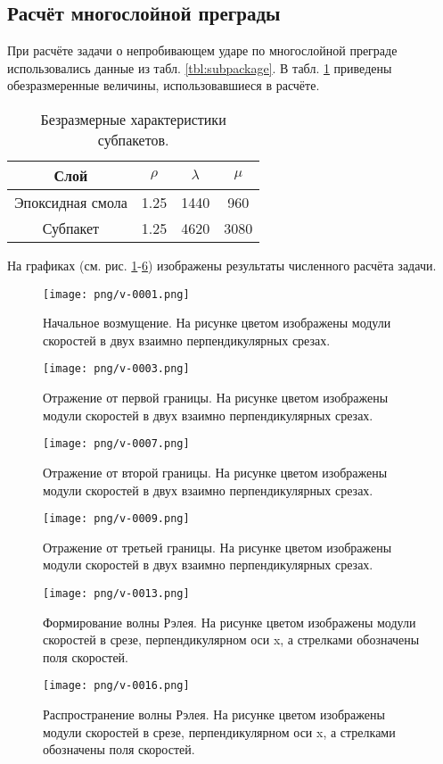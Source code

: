 \subsection{Расчёт многослойной преграды}
При расчёте задачи о непробивающем ударе по многослойной преграде использовались
данные из табл. \ref{tbl:subpackage}. В табл. \ref{tbl:subpackage_2} приведены
обезразмеренные величины, использовавшиеся в расчёте.
\begin{table}[h]
\centering
\begin{tabular}{|c|c|c|c|}
\hline
Слой & $\rho$ & $\lambda$ & $\mu$  \\
\hline
Эпоксидная смола & 1.25 & 1440 & 960 \\
Субпакет & 1.25 & 4620 & 3080 \\
\hline
\end{tabular}
\caption{Безразмерные характеристики субпакетов.}
\label{tbl:subpackage_2}
\end{table}
На графиках (см. рис. \ref{pic:multilayer_init}-\ref{pic:multilayer_Rayleigh_2})
изображены результаты численного расчёта задачи.
\begin{figure}[htp]
\centering
\texttt{[image: png/v-0001.png]}
\caption{Начальное возмущение. На рисунке цветом изображены модули скоростей в
двух взаимно перпендикулярных срезах.}
\label{pic:multilayer_init}
\end{figure}
\begin{figure}[htp]
\centering
\texttt{[image: png/v-0003.png]}
\caption{Отражение от первой границы. На рисунке цветом изображены модули скоростей в
двух взаимно перпендикулярных срезах.}
\label{pic:multilayer_b1}
\end{figure}
\begin{figure}[htp]
\centering
\texttt{[image: png/v-0007.png]}
\caption{Отражение от второй границы. На рисунке цветом изображены модули скоростей в
двух взаимно перпендикулярных срезах.}
\label{pic:multilayer_b2}
\end{figure}
\begin{figure}[htp]
\centering
\texttt{[image: png/v-0009.png]}
\caption{Отражение от третьей границы. На рисунке цветом изображены модули скоростей в
двух взаимно перпендикулярных срезах.}
\label{pic:multilayer_b3}
\end{figure}
\begin{figure}[htp]
\centering
\texttt{[image: png/v-0013.png]}
\caption{Формирование волны Рэлея. На рисунке цветом изображены модули скоростей
в срезе, перпендикулярном оси x, а стрелками обозначены поля скоростей.}
\label{pic:multilayer_b3}
\end{figure}
\begin{figure}[htp]
\centering
\texttt{[image: png/v-0016.png]}
\caption{Распространение волны Рэлея. На рисунке цветом изображены модули скоростей
в срезе, перпендикулярном оси x, а стрелками обозначены поля скоростей.}
\label{pic:multilayer_Rayleigh_2}
\end{figure}

